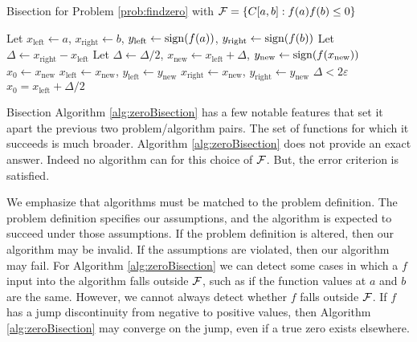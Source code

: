 \begin{algorithm}
\caption{Bisection for Problem \ref{prob:findzero} with $\mathcal{F} = \{C[a,b] : f(a)f(b) \le 0\}$  \label{alg:zeroBisection}}
	\begin{algorithmic}
    \State Let $x_{\text{left}} \leftarrow a$, $x_{\text{right}} \leftarrow b$, $y_{\text{left}} \leftarrow \operatorname{sign}(f(a))$, $y_{\text{right}} \leftarrow \operatorname{sign}(f(b))$
    \State Let $\Delta \leftarrow x_{\text{right}}- x_{\text{left}}$
    \Repeat
    \State Let $\Delta \leftarrow \Delta/2$, $x_{\text{new}} \leftarrow x_{\text{left}} + \Delta$, $y_{\text{new}} \leftarrow \operatorname{sign}(f(x_{\text{new}}))$
    \RETURN $x_0 \leftarrow x_\text{new}$
    \State $x_{\text{left}} \leftarrow x_{\text{new}}$, $y_{\text{left}} \leftarrow y_{\text{new}}$
    \Else
        \State $x_{\text{right}} \leftarrow x_{\text{new}}$, $y_{\text{right}} \leftarrow y_{\text{new}}$
    \EndIf
    \Until $\Delta < 2\varepsilon$
    \RETURN $x_0 = x_{\text{left}} + \Delta/2$

    \end{algorithmic}
\end{algorithm}

Bisection Algorithm \ref{alg:zeroBisection} has a few notable features that set it apart the previous two problem/algorithm pairs.  The set of functions for which it succeeds is much broader.  Algorithm \ref{alg:zeroBisection} does not provide an exact answer.  Indeed no algorithm can for this choice of $\mathcal{F}$. But, the error criterion is satisfied. 

We emphasize that algorithms must be matched to the problem definition.  The problem definition specifies our assumptions, and the algorithm is expected to succeed under those assumptions.  If the problem definition is altered, then our algorithm may be invalid.  If the assumptions are violated, then our algorithm may fail.  For Algorithm \ref{alg:zeroBisection} we can detect some cases in which a $f$ input into the algorithm falls outside $\mathcal{F}$, such as if the function values at $a$ and $b$ are the same.  However, we cannot always detect whether $f$ falls outside $\mathcal{F}$.  If $f$ has a jump discontinuity from negative to positive values, then Algorithm \ref{alg:zeroBisection} may converge on the jump, even if a true zero exists elsewhere.

